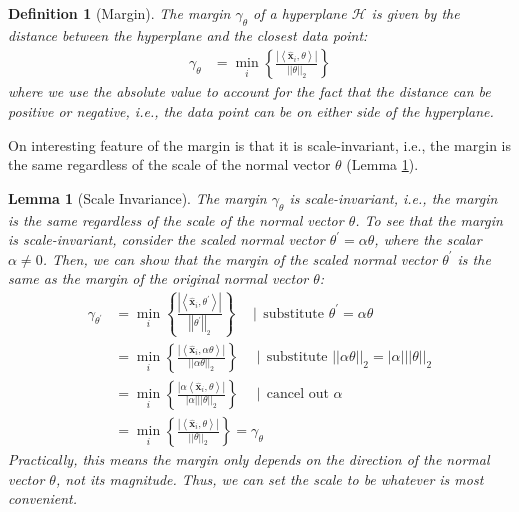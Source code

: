 \documentclass{article}[11pt]
\newtheorem{lemma}{Lemma}
\newtheorem{defn}{Definition}
\newcommand{\norm}[1]{\left|\left|#1\right|\right|}
\begin{document}
\begin{defn}[Margin]\label{defn:margin}
    The margin $\gamma_{\theta}$ of a hyperplane $\mathcal{H}$ is given by the distance between the hyperplane and the closest data point:
    \begin{align*}
        \gamma_{\theta} & = \min_{i}\left\{\frac{|\left<\hat{\mathbf{x}}_{i},\theta\right>|}{\norm{\theta}_{2}}\right\}
    \end{align*}
where we use the absolute value to account for the fact that the distance can be positive or negative, i.e., the data point can be on either side of the hyperplane.
\end{defn}

On interesting feature of the margin is that it is scale-invariant, i.e., the margin is the same regardless of the scale of the normal vector $\theta$
(Lemma \ref{lem:scale-invariance}).
\begin{lemma}[Scale Invariance]\label{lem:scale-invariance}
    The margin $\gamma_{\theta}$ is scale-invariant, i.e., the margin is the same regardless of the scale of the normal vector $\theta$.
    To see that the margin is scale-invariant, consider the scaled normal vector $\theta^{\prime} = \alpha\theta$, where the scalar $\alpha\neq{0}$.
    Then, we can show that the margin of the scaled normal vector $\theta^{\prime}$ is the same as the margin of the original normal vector $\theta$:
    \begin{align*}
        \gamma_{\theta^{\prime}} & = \min_{i}\left\{\frac{|\left<\hat{\mathbf{x}}_{i},\theta^{\prime}\right>|}{\norm{\theta^{\prime}}_{2}}\right\}\quad\mid\,\text{substitute $\theta^{\prime} = \alpha\theta$} \\
        & = \min_{i}\left\{\frac{|\left<\hat{\mathbf{x}}_{i},\alpha\theta\right>|}{\norm{\alpha\theta}_{2}}\right\}\quad\mid\,\text{substitute $\norm{\alpha\theta}_{2} = |\alpha|\norm{\theta}_{2}$} \\
        & = \min_{i}\left\{\frac{|\alpha\left<\hat{\mathbf{x}}_{i},\theta\right>|}{|\alpha|\norm{\theta}_{2}}\right\}\quad\mid\,\text{cancel out $\alpha$} \\
        & = \min_{i}\left\{\frac{|\left<\hat{\mathbf{x}}_{i},\theta\right>|}{\norm{\theta}_{2}}\right\} = \gamma_{\theta}
    \end{align*}
    Practically, this means the margin only depends on the direction of the normal vector $\theta$, not its magnitude.
    Thus, we can set the scale to be whatever is most convenient.
\end{lemma}
\end{document}
